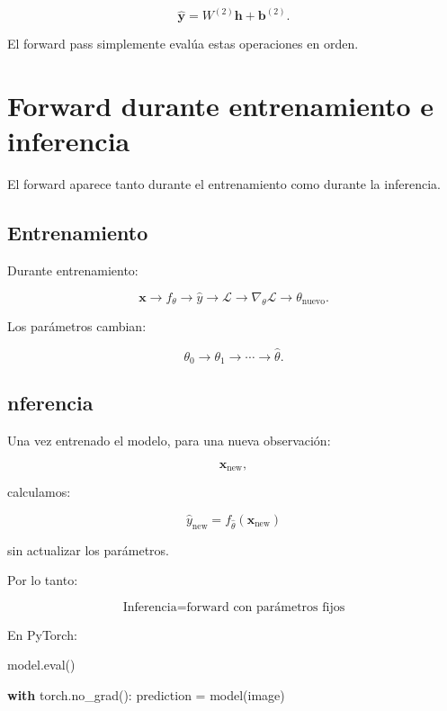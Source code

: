 \documentclass[
  letterpaper,
  DIV=11,
  numbers=noendperiod]{scrartcl}
\newenvironment{Shaded}{\begin{snugshade}}{\end{snugshade}}
\newcommand{\BuiltInTok}[1]{\textcolor[rgb]{0.00,0.23,0.31}{#1}}
\newcommand{\ControlFlowTok}[1]{\textcolor[rgb]{0.00,0.23,0.31}{\textbf{#1}}}
\newcommand{\NormalTok}[1]{\textcolor[rgb]{0.00,0.23,0.31}{#1}}
\newcommand{\OperatorTok}[1]{\textcolor[rgb]{0.37,0.37,0.37}{#1}}
\begin{document}
\[
\hat{\mathbf y}
=
W^{(2)}\mathbf h+\mathbf b^{(2)}.
\]

El forward pass simplemente evalúa estas operaciones en orden.

\section{Forward durante entrenamiento e
inferencia}\label{forward-durante-entrenamiento-e-inferencia}

El forward aparece tanto durante el entrenamiento como durante la
inferencia.

\subsection{Entrenamiento}\label{entrenamiento}

Durante entrenamiento:

\[
\mathbf x
\rightarrow
f_\theta
\rightarrow
\hat y
\rightarrow
\mathcal L
\rightarrow
\nabla_\theta\mathcal L
\rightarrow
\theta_{\mathrm{nuevo}}.
\]

Los parámetros cambian:

\[
\theta_0
\rightarrow
\theta_1
\rightarrow
\cdots
\rightarrow
\hat\theta.
\]

\subsection{nferencia}\label{nferencia}

Una vez entrenado el modelo, para una nueva observación:

\[
\mathbf x_{\mathrm{new}},
\]

calculamos:

\[
\boxed{
\hat y_{\mathrm{new}}
=
f_{\hat\theta}(\mathbf x_{\mathrm{new}})
}
\]

sin actualizar los parámetros.

Por lo tanto:

\[
\boxed{
\text{Inferencia}
=
\text{forward con parámetros fijos}
}
\]

En PyTorch:

\begin{Shaded}
\begin{Highlighting}[]
\NormalTok{model.}\BuiltInTok{eval}\NormalTok{()}

\ControlFlowTok{with}\NormalTok{ torch.no\_grad():}
\NormalTok{    prediction }\OperatorTok{=}\NormalTok{ model(image)}
\end{Highlighting}
\end{Shaded}
\end{document}
